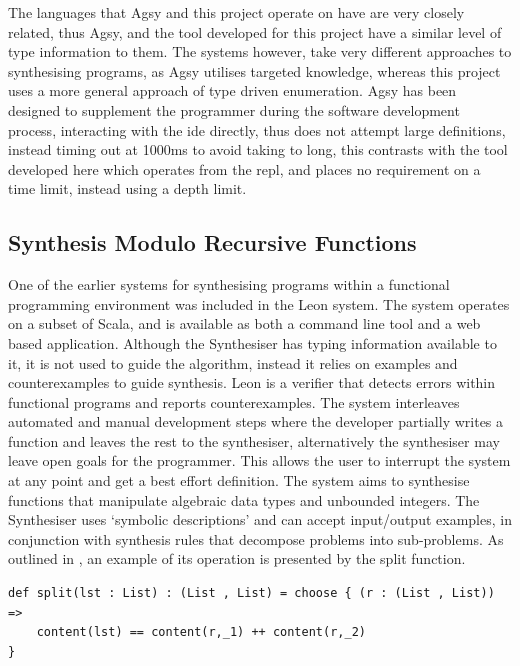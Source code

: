 \documentclass[a4paper]{article}
\begin{document}
The languages that Agsy and this project operate on have are very
closely related, thus Agsy, and the tool developed for this project
have a similar level of type information to them. The systems however,
take very different approaches to synthesising programs, as Agsy
utilises targeted knowledge, whereas this project uses a more general
approach of type driven enumeration. Agsy has been designed to supplement the
programmer during the software development process, interacting with
the ide directly, thus does not attempt large definitions, instead
timing out at 1000ms to avoid taking to long, this contrasts with the tool
developed here which operates from the repl, and places no requirement on
a time limit, instead using a depth limit.

\subsection{Synthesis Modulo Recursive Functions}
\label{sec:orge127ff1}
One of the earlier systems for synthesising programs within a functional
programming environment was included in the Leon system. The system 
operates on a subset of Scala, and is available as both a command line
tool and a web based application. Although the Synthesiser has typing 
information available to it, it is not used to guide the algorithm, 
instead it relies on examples and counterexamples to guide synthesis.
Leon is a verifier that detects errors within functional programs and 
reports counterexamples. The system interleaves automated and manual 
development steps where the developer partially writes a function and 
leaves the rest to the synthesiser, alternatively the synthesiser may 
leave open goals for the programmer. This allows the user to interrupt 
the system at any point and get a best effort definition. The system 
aims to synthesise functions that manipulate algebraic data types and 
unbounded integers. The Synthesiser uses `symbolic descriptions' and
can accept input/output examples, in conjunction with synthesis rules
that decompose problems into sub-problems. As outlined in \cite{10.1145/2544173.2509555},
an example of its operation is presented by the split function.

\begin{center}
\begin{verbatim}
def split(lst : List) : (List , List) = choose { (r : (List , List)) => 
	content(lst) == content(r,_1) ++ content(r,_2)
}
\end{verbatim}
\end{center}
\end{document}
